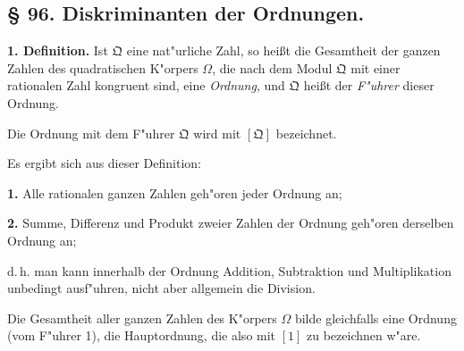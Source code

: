 \documentclass[12pt,a4paper]{article}
\theoremstyle{plain}
\begin{document}
\subsection*{\S{} 96. Diskriminanten der Ordnungen.}

\textbf{1. Definition.} Ist $\mathfrak{Q}$ eine nat"urliche Zahl, so hei\ss t die Gesamtheit der ganzen Zahlen des quadratischen K"orpers $\Omega$, die nach dem Modul $\mathfrak{Q}$ mit einer rationalen Zahl kongruent sind, eine \textit{Ordnung}, und $\mathfrak{Q}$ hei\ss t der \textit{F"uhrer} dieser Ordnung.

Die Ordnung mit dem F"uhrer $\mathfrak{Q}$ wird mit $[\mathfrak{Q}]$ bezeichnet.

Es ergibt sich aus dieser Definition:

\textbf{1.} Alle rationalen ganzen Zahlen geh"oren jeder Ordnung an;

\textbf{2.} Summe, Differenz und Produkt zweier Zahlen der Ordnung geh"oren derselben Ordnung an;

d.\,h. man kann innerhalb der Ordnung Addition, Subtraktion und Multiplikation unbedingt ausf"uhren, nicht aber allgemein die Division.

Die Gesamtheit aller ganzen Zahlen des K"orpers $\Omega$ bilde gleichfalls eine Ordnung (vom F"uhrer 1), die Hauptordnung, die also mit $[1]$ zu bezeichnen w"are.
\end{document}
